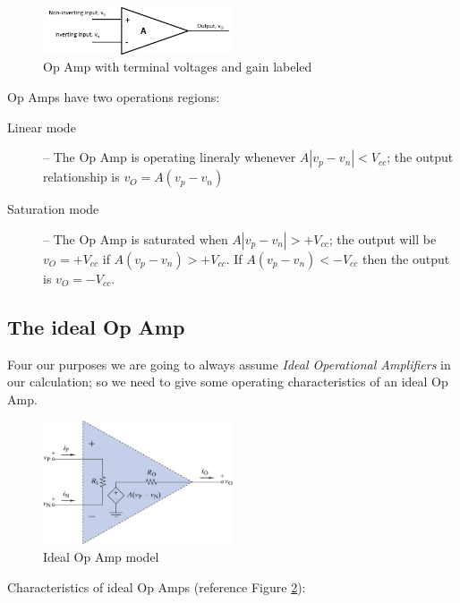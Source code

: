 \documentclass{handout}
\begin{document}
\begin{figure} [h! t! b!]
\centering
\includegraphics[width=0.5\textwidth]{OpAmp2.jpg}
\caption{Op Amp with terminal voltages  and gain labeled}
\label{fig: OpAmp2}
\end{figure}

Op Amps have two operations regions:
\begin{description}
\item[Linear mode] -- The Op Amp is operating lineraly whenever $A|v_p-v_n|<V_{cc}$; the output relationship is $v_O=A(v_p-v_n)$
\item[Saturation mode] -- The Op Amp is saturated when $A|v_p-v_n|>+V_{cc}$; the output will be $v_O=+V_{cc}$ if $A(v_p-v_n)>+V_{cc}$.  If $A(v_p-v_n)<-V_{cc}$ then the output is $v_O=-V_{cc}$.
\end{description}

\subsection{The ideal Op Amp}
Four our purposes we are going to always assume {\em Ideal Operational Amplifiers} in our calculation; so we need to give some operating characteristics of an ideal Op Amp.

\begin{figure} [h! t! b!]
\centering
\includegraphics[width=0.5\textwidth]{IdealOpAmpModel.jpg}
\caption{Ideal Op Amp model}
\label{fig: IdealOpAmp}
\end{figure}

Characteristics of ideal Op Amps (reference Figure \ref{fig: IdealOpAmp}):
\end{document}
